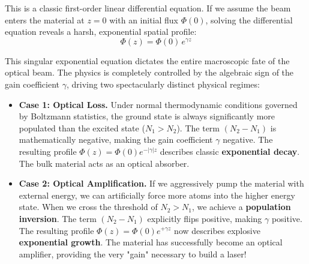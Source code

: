 This is a classic first-order linear differential equation. If we assume the beam enters the material at $z=0$ with an initial flux $\Phi(0)$, solving the differential equation reveals a harsh, exponential spatial profile:
\begin{equation*}
    \Phi(z) = \Phi(0)\,e^{\gamma z}
\end{equation*}

\begin{keyinsight}
    This singular exponential equation dictates the entire macroscopic fate of the optical beam. The physics is completely controlled by the algebraic sign of the gain coefficient $\gamma$, driving two spectacularly distinct physical regimes:
    \begin{itemize}
        \item \textbf{Case 1: Optical Loss.} Under normal thermodynamic conditions governed by Boltzmann statistics, the ground state is always significantly more populated than the excited state ($N_1 > N_2$). The term $(N_2 - N_1)$ is mathematically negative, making the gain coefficient $\gamma$ negative. The resulting profile $\Phi(z) = \Phi(0)e^{-|\gamma| z}$ describes classic \textbf{exponential decay}. The bulk material acts as an optical absorber.

        \item \textbf{Case 2: Optical Amplification.} If we aggressively pump the material with external energy, we can artificially force more atoms into the higher energy state. When we cross the threshold of $N_2 > N_1$, we achieve a \textbf{population inversion}. The term $(N_2 - N_1)$ explicitly flips positive, making $\gamma$ positive. The resulting profile $\Phi(z) = \Phi(0)e^{+\gamma z}$ now describes explosive \textbf{exponential growth}. The material has successfully become an optical amplifier, providing the very "gain" necessary to build a laser!
    \end{itemize}
\end{keyinsight}
